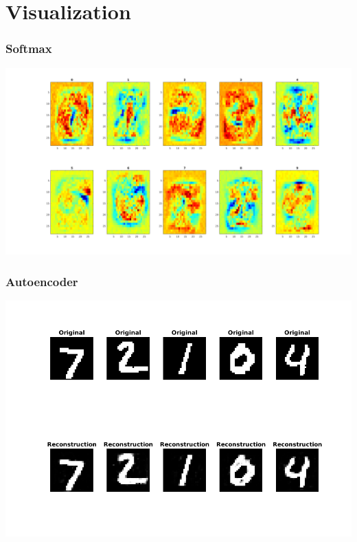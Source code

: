 \documentclass[7pt]{beamer}
\begin{document}
\begin{sloppypar}
\section{Visualization}

\begin{frame}
\frametitle{Softmax}
\begin{justify}
\begin{center}
	\includegraphics[scale=0.2]{visualize_softmax}
\end{center}
\end{justify}
\end{frame}

\begin{frame}
\frametitle{Autoencoder}
\begin{justify}
\begin{center}
	\includegraphics[scale=0.4]{visualize_autoencoder}
\end{center}
\end{justify}
\end{frame}


\end{sloppypar}
\end{document}
